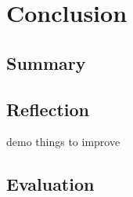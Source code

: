 \chapter{Conclusion}


\section{Summary}

\section{Reflection}
demo
things to improve

\section{Evaluation}